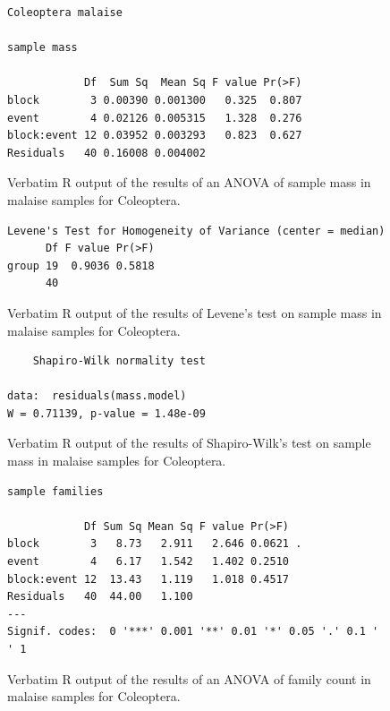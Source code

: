 \documentclass[10pt,letterpaper,twocolumn]{article}
\begin{document}
\begin{figure}[h]
	\lstset{numbers=left}
	\lstset{xleftmargin=5mm,framexleftmargin=5mm}
	\begin{lstlisting}
Coleoptera malaise 

sample mass 

            Df  Sum Sq  Mean Sq F value Pr(>F)
block        3 0.00390 0.001300   0.325  0.807
event        4 0.02126 0.005315   1.328  0.276
block:event 12 0.03952 0.003293   0.823  0.627
Residuals   40 0.16008 0.004002               
	\end{lstlisting}
	\caption{Verbatim R output of the results of an ANOVA of sample mass in malaise samples for Coleoptera.}
	\label{fig:malaise_coleoptera_mass_anova}
	\smallskip
	\nointerlineskip
	\hrulefill
\end{figure}

\begin{figure}[h]
	\lstset{numbers=left}
	\lstset{xleftmargin=5mm,framexleftmargin=5mm}
	\begin{lstlisting}
Levene's Test for Homogeneity of Variance (center = median)
      Df F value Pr(>F)
group 19  0.9036 0.5818
      40               
	\end{lstlisting}
	\caption{Verbatim R output of the results of Levene's test on sample mass in malaise samples for Coleoptera.}
	\label{fig:malaise_coleoptera_mass_levene}
	\smallskip
	\nointerlineskip
	\hrulefill
\end{figure}

\begin{figure}[h]
	\lstset{numbers=left}
	\lstset{xleftmargin=5mm,framexleftmargin=5mm}
	\begin{lstlisting}
	Shapiro-Wilk normality test

data:  residuals(mass.model)
W = 0.71139, p-value = 1.48e-09
	\end{lstlisting}
	\caption{Verbatim R output of the results of Shapiro-Wilk's test on sample mass in malaise samples for Coleoptera.}
	\label{fig:malaise_coleoptera_mass_shapiro}
	\smallskip
	\nointerlineskip
	\hrulefill
\end{figure}

\begin{figure}[h]
	\lstset{numbers=left}
	\lstset{xleftmargin=5mm,framexleftmargin=5mm}
	\begin{lstlisting}
sample families 

            Df Sum Sq Mean Sq F value Pr(>F)  
block        3   8.73   2.911   2.646 0.0621 .
event        4   6.17   1.542   1.402 0.2510  
block:event 12  13.43   1.119   1.018 0.4517  
Residuals   40  44.00   1.100                 
---
Signif. codes:  0 '***' 0.001 '**' 0.01 '*' 0.05 '.' 0.1 ' ' 1
	\end{lstlisting}
	\caption{Verbatim R output of the results of an ANOVA of family count in malaise samples for Coleoptera.}
	\label{fig:malaise_coleoptera_family_anova}
	\smallskip
	\nointerlineskip
	\hrulefill
\end{figure}
\end{document}
